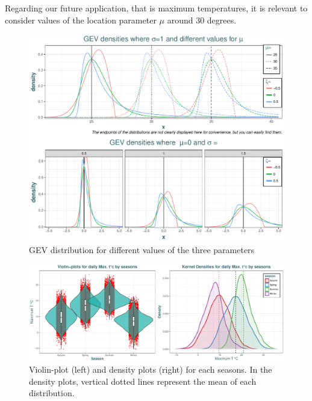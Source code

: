 Regarding our future application, that is maximum temperatures, it is relevant to consider values of the location parameter $\mu$ around 30 degrees. 


\begin{figure}[!htb]
	\includegraphics[width=\linewidth]{gevdif.pdf}\caption{GEV distribution for different values of the three parameters }\label{fig:gevdif}
\end{figure}




\begin{figure}[!htb]
	\includegraphics[width=1\linewidth]{violin_density.pdf}\caption{ Violin-plot (left) and density plots (right) for each seasons. In the density plots, vertical dotted lines represent the mean of each distribution.}\label{fig:violin_density}
\end{figure}

